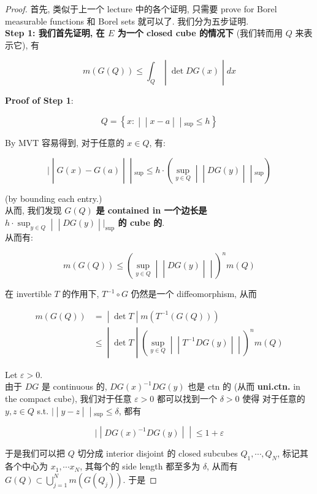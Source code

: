 \begin{proof}

首先, 类似于上一个 lecture 中的各个证明, 只需要 prove for Borel measurable functions 和 Borel sets 就可以了. 我们分为五步证明.\\
\textbf{Step 1: 我们首先证明, 在 \(E\) 为一个 closed cube 的情况下} (我们转而用 \(Q\) 来表示它), 有

\[\left. m(G(Q)) \leq \int_{Q} \middle| \det DG(x) \middle| dx \right.\]

\textbf{Proof of Step 1}:

\[Q = \left\{ x: \middle| \middle| x - a \middle| \middle| {}_{\sup} \leq h \right\}\]

By MVT 容易得到, 对于任意的 \(x \in Q\), 有:

\[\left. | \middle| G(x) - G(a) \middle| \middle| {}_{\sup} \leq h \cdot (\sup\limits_{y \in Q} \middle| \middle| DG(y) \middle| \middle| {}_{\sup}) \right.\]

(by bounding each entry.)\\
从而, 我们发现 \(G(Q)\) \textbf{是 contained in 一个边长是 \(\left. h \cdot \sup_{y \in Q} \middle| \middle| DG(y) \middle| |_{\sup} \right.\) 的 cube 的}.\\
从而有:

\[\left. m(G(Q)) \leq (\sup\limits_{y \in Q} \middle| \middle| DG(y) \middle| \middle| )^{n}m(Q) \right.\]

在 invertible \(T\) 的作用下, \(T^{- 1} \circ G\) 仍然是一个 diffeomorphism, 从而

\[\begin{matrix}
{m(G(Q))} & \left. = \middle| \det T \middle| m(T^{- 1}(G(Q))) \right. \\
 & \left. \leq \middle| \det T \middle| (\sup\limits_{y \in Q} \middle| \middle| T^{- 1}DG(y) \middle| \middle| )^{n}m(Q) \right.
\end{matrix}\]

Let \(\varepsilon > 0\).\\
由于 \(DG\) 是 continuous 的, \(DG(x)^{- 1}DG(y)\) 也是 ctn 的 (从而 \textbf{uni.ctn.} in the compact cube), 我们对于任意 \(\varepsilon > 0\) 都可以找到一个 \(\delta > 0\) 使得 对于任意的 \(y,z \in Q\) s.t. \(\left. | \middle| y - z \middle| \middle| {}_{\sup} \leq \delta \right.\), 都有

\[\left. | \middle| DG(x)^{- 1}DG(y) \middle| \middle| \leq 1 + \varepsilon \right.\]

于是我们可以把 \(Q\) 切分成 interior disjoint 的 closed subcubes \(Q_{1},\cdots,Q_{N}\), 标记其各个中心为 \(x_{1},\cdots x_{N}\), 其每个的 side length 都至多为 \(\delta\), 从而有 \(G(Q) \subset \bigcup_{j = 1}^{N}m(G(Q_{j}))\). 于是


\end{proof}
